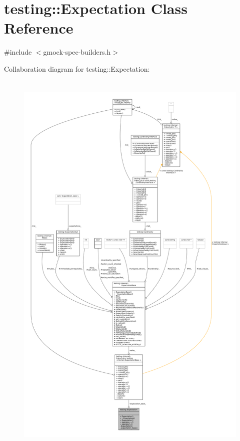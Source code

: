 \hypertarget{classtesting_1_1Expectation}{}\section{testing\+:\+:Expectation Class Reference}
\label{classtesting_1_1Expectation}


{\ttfamily \#include $<$gmock-\/spec-\/builders.\+h$>$}



Collaboration diagram for testing\+:\+:Expectation\+:
\nopagebreak
\begin{figure}[H]
\begin{center}
\leavevmode
\includegraphics[height=550pt]{classtesting_1_1Expectation__coll__graph}
\end{center}
\end{figure}
